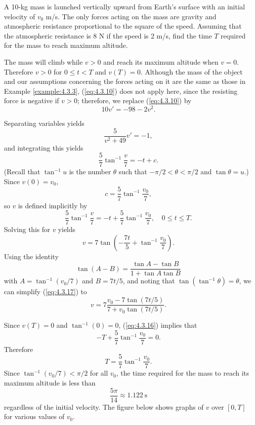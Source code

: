\documentclass{ximera}
\begin{document}
\begin{example}
\begin{explanation}
 
\end{explanation}
\end{example}
 
\begin{example}\label{example:4.3.4}
A 10-kg mass is launched vertically upward from Earth's surface with
an initial velocity of $v_0$ m/s. The only forces acting on the mass
are gravity and atmospheric resistance proportional to the square of
the speed. Assuming that the atmospheric resistance is 8 N if the
speed is 2 m/s, find the time $T$ required for the mass to reach
maximum altitude.
 
 
\begin{explanation}  The mass will
climb while $v>0 $ and reach its maximum altitude when $v=0$.
Therefore $v>0$ for $0\leq t<T$ and $v(T)=0$. Although the mass of
the object and our assumptions concerning the forces acting on it are
the same as those in Example \ref{example:4.3.3},  (\ref{eq:4.3.10}) does
not apply here, since the resisting force is negative if $v>0$;
therefore, we replace (\ref{eq:4.3.10}) by
\begin{equation} \label{eq:4.3.15}
10v'=-98-2v^2.
\end{equation}
 
Separating variables  yields
$$
\frac{5}{v^2+49}v'=-1,
$$
 and integrating this yields
$$
\frac{5}{7}\tan^{-1}\frac{v}{7}=-t+c.
$$
 (Recall that $\tan^{-1}u$ is the number $\theta$
such that $-\pi/2 < \theta < \pi/2$ and $\tan \theta=u$.)
 Since $v(0)=v_0$,
$$
c=\frac{5}{7}\tan^{-1}\frac{v_0}{7},
$$
so $v$ is defined implicitly by
\begin{equation} \label{eq:4.3.16}
\frac{5}{7} \tan^{-1}\frac{v}{7}=-t+\frac{5}{7}
\tan^{-1}\frac{v_0}{7}, \quad 0\leq t\leq T.
\end{equation}
Solving this for $v$ yields
\begin{equation} \label{eq:4.3.17}
v=7\tan\left(-\frac{7t}{5}+\tan^{-1}\frac{v_0}{7}\right).
\end{equation}
Using the identity
$$
\tan(A-B)=\frac{\tan A-\tan B}{1+\tan A\tan B}
$$
with $A=\tan^{-1}(v_0/7)$ and $B=7t/5$, and noting that
$\tan(\tan^{-1}\theta)=\theta$,
we can simplify (\ref{eq:4.3.17}) to
$$
v=7\frac{v_0-7\tan(7t/5)}{7+v_0\tan(7t/5)}.
$$
 
 Since $v(T)=0$ and $\tan^{-1}(0)=0$, (\ref{eq:4.3.16}) implies that
$$
-T+\frac{5}{7} \tan^{-1}\frac{v_0}{7}=0.
$$
Therefore
$$
T=\frac{5}{7} \tan^{-1}\frac{v_0}{7}.
$$
Since $\tan^{-1}(v_0/7)<\pi/2$ for all $v_0$,
the  time required for the mass to reach its maximum
altitude is less than
$$
\frac{5\pi}{14} \approx 1.122\  \mbox{s}
$$
regardless of the initial velocity.  The figure below
shows graphs of $v$ over $[0,T]$ for various values of $v_0$.


\end{explanation}
\end{example}
\end{document}
